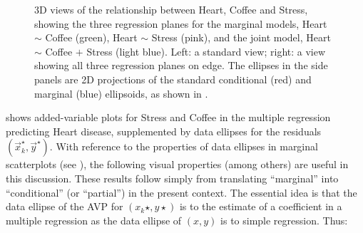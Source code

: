 \begin{figure}[htb]
\begin{minipage}[b]{.49\linewidth}
 \end{minipage}
  \caption{3D views of the relationship between Heart, Coffee and Stress, showing the three regression planes
  for the marginal models, Heart $\sim$ Coffee (green), Heart $\sim$ Stress (pink), and the joint model, Heart $\sim$ Coffee $+$ Stress (light blue).
  Left: a standard view; right: a view showing all three regression planes on edge.
  The ellipses in the side panels are 2D projections of the standard conditional (red) and marginal (blue) ellipsoids, as shown in .
  }
  \label{fig:coffee-av3D}
\end{figure}


 shows added-variable plots for Stress and Coffee in the multiple regression predicting Heart disease,
supplemented by data ellipses for the residuals $(\vec{x}_k^\star, \vec{y}^\star)$.  With reference to the properties
of data ellipses in marginal scatterplots (see ), the following visual properties (among others)
are useful in this discussion.  These results follow simply from translating ``marginal'' into ``conditional'' (or ``partial'')
in the present context. 
The essential idea is that the data ellipse of the AVP for $(x_k\star, y\star)$ is to the estimate of a 
coefficient in a multiple regression as
 the data ellipse of $(x, y)$ is to simple regression. Thus:


